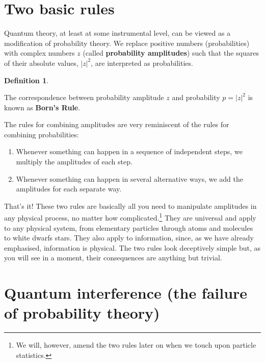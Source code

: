 \documentclass[
]{book}
\providecommand{\tightlist}{%
  \setlength{\itemsep}{0pt}\setlength{\parskip}{0pt}}
\theoremstyle{definition}
\newtheorem{definition}{Definition}[chapter]
\theoremstyle{definition}
\theoremstyle{definition}
\theoremstyle{remark}
\begin{document}
\hypertarget{two-basic-rules}{%
\section{Two basic rules}\label{two-basic-rules}}

Quantum theory, at least at some instrumental level, can be viewed as a modification of probability theory.
We replace positive numbers (probabilities) with complex numbers \(z\) (called \textbf{probability amplitudes}) such that the squares of their absolute values, \(|z|^2\), are interpreted as probabilities.

\begin{definition}
\protect\hypertarget{def:unlabeled-div-1}{}\label{def:unlabeled-div-1}

The correspondence between probability amplitude \(z\) and probability \(p=|z|^2\) is known as \textbf{Born's Rule}.

\end{definition}

The rules for combining amplitudes are very reminiscent of the rules for combining probabilities:

\begin{enumerate}
\def\labelenumi{\arabic{enumi}.}
\tightlist
\item
  Whenever something can happen in a sequence of independent steps, we multiply the amplitudes of each step.
\item
  Whenever something can happen in several alternative ways, we add the amplitudes for each separate way.
\end{enumerate}

That's it!
These two rules are basically all you need to manipulate amplitudes in any physical process, no matter how complicated.\footnote{We will, however, amend the two rules later on when we touch upon particle statistics.}
They are universal and apply to any physical system, from elementary particles through atoms and molecules to white dwarfs stars.
They also apply to information, since, as we have already emphasised, information is physical.
The two rules look deceptively simple but, as you will see in a moment, their consequences are anything but trivial.

\hypertarget{quantum-interference-the-failure-of-probability-theory}{%
\section{Quantum interference (the failure of probability theory)}\label{quantum-interference-the-failure-of-probability-theory}}
\end{document}
